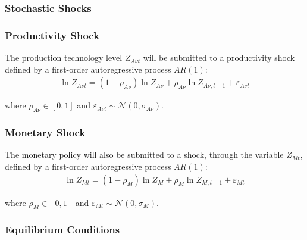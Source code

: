 \documentclass[
thesis.tex
]{subfiles}
\begin{document}

\subsubsection{Stochastic Shocks}\label{sec:reg-stochastic-shocks}

\subsubsection*{Productivity Shock} \label{sec:reg-productivity-shock}

The production technology level $Z_{A\nu t}$ will be submitted to a productivity shock defined by a first-order autoregressive process $AR(1)$:
\begin{align}
	\ln{Z_{A\nu t}} = (1-\rho_{A\nu})\ln{Z_{A\nu}} + \rho_{A\nu}\ln{Z_{A\nu,t-1}} + \varepsilon_{A\nu t} \label{eq:reg-productivity-shock}
\end{align}

where $\rho_{A\nu} \in [0,1]$ and $\varepsilon_{A\nu t} \sim \mathscr{N}(0,\sigma_{A\nu})$.

\subsubsection*{Monetary Shock} \label{sec:reg-monetary-shock}

The monetary policy will also be submitted to a shock, through the variable $Z_{Mt}$, defined by a first-order autoregressive process $AR(1)$:
\begin{align}
	\ln{Z_{Mt}} = (1-\rho_M)\ln{Z_{M}} + \rho_M\ln{Z_{M,t-1}} + \varepsilon_{Mt} \label{eq:reg-monetary-shock}
\end{align}

where $\rho_M \in [0,1]$ and $\varepsilon_{Mt} \sim \mathscr{N}(0,\sigma_M)$.


\subsubsection{Equilibrium Conditions}

\end{document}
